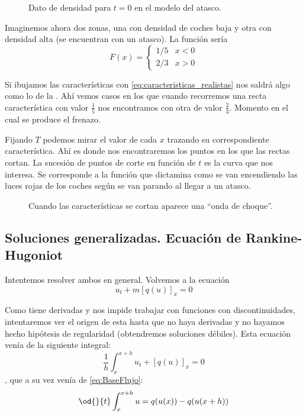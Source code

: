 		\begin{example}[Frenazo]
			\begin{wrapfigure}[10]{R}{0.4\textwidth}
				\centering
				\vspace{-10pt}
				\caption{Dato de densidad para $t=0$ en el modelo del atasco.}
				\label{fig:modeloAtasco}
			\end{wrapfigure}

			Imaginemos ahora dos zonas, una con densidad de coches baja y otra con densidad alta (se encuentran con un atasco). La función sería  \[
			F(x) =
			\begin{cases}
				1/5 & x < 0 \\
				2/3 & x > 0
			\end{cases}
			\]

			Si ibujamos las características con \eqref{eq:caracteristicas_realistas} nos saldrá algo como lo de la . Ahí vemos casos en los que cuando recorremos una recta característica con valor $\frac{1}{5}$ nos encontramos con otra de valor $\frac{2}{3}$. Momento en el cual se produce el frenazo.

			Fijando $T$ podemos mirar el valor de cada $x$ trazando su correspondiente característica. Ahí es donde nos encontraremos los puntos en los que las rectas cortan. La sucesión de puntos de corte en función de $t$ es la curva que nos interesa. Se corresponde a la función que dictamina como se van encendiendo las luces rojas de los coches según se van parando al llegar a un atasco.

			\begin{figure}[bhp]
				\centering
				\caption{Cuando las características se cortan aparece una ``onda de choque''.}
				\label{fig:ondaChoque}
			\end{figure}

		\end{example}

		\subsection{Soluciones generalizadas. Ecuación de Rankine-Hugoniot}

		Intentemos resolver ambos en general. Volvemos a la ecuación \[ u_t +m [q(u)]_x = 0 \]

		Como tiene derivadas y nos impide trabajar con funciones con discontinuidades, intentaremos ver el origen de esta hasta que no haya derivadas y no hayamos hecho hipótesis de regularidad (obtendremos soluciones débiles). Esta ecuación venía de la siguiente integral: \[
			\frac{1}{h} \int^{x+h}_{x} u_t + [q(u)]_x = 0
		\], que a su vez venía de \eqref{eq:BaseFlujo}: \[
			\od{}{t} \int^{x+h}_{x} u = q(u(x))-q(u(x+h))
		\]

